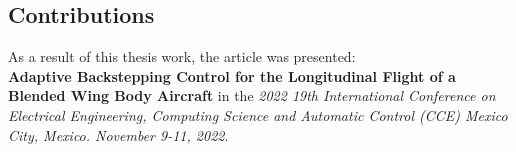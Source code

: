 \subsection{Contributions}
As a result of this thesis work, the article was presented:\\ \textbf{Adaptive Backstepping Control for the Longitudinal Flight of a Blended Wing Body Aircraft} in the
\textit{2022 19th International Conference on Electrical Engineering, Computing Science and Automatic Control (CCE) Mexico City, Mexico. November 9-11, 2022}. 






